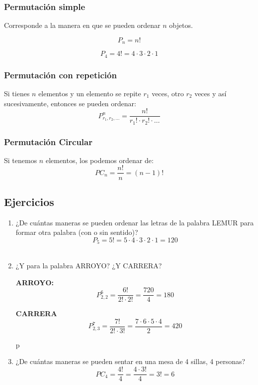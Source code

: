 \documentclass[12pt, letterpaper]{article}
\begin{document}
\subsubsection{Permutación simple} Corresponde a la manera en que se pueden ordenar $n$ objetos.
\begin{minipage}{0.35\textwidth}
	\centering
	\[ P_n = n! \]
\end{minipage}
\hfill
\begin{minipage}{0.55\textwidth}
	\centering
	\[ P_4 = 4!= 4 \cdot 3 \cdot 2 \cdot 1 \]
\end{minipage}

\subsubsection{Permutación con repetición} Si tienes $n$ elementos y un elemento se repite $r_1$ veces, otro $r_2$ veces y así sucesivamente, entonces se pueden ordenar:
\[ P_{r_1, r_2, \dots}^n = \frac{n!}{r_1! \cdot r_2! \cdot \dots} \]

\subsubsection{Permutación Circular} Si tenemos $n$ elementos, los podemos ordenar de:
\[ PC_n = \frac{n!}{n} = (n-1)! \]

\subsection{Ejercicios}

\begin{enumerate}[label=\alph*.)]
	\item ¿De cuántas maneras se pueden ordenar las letras de la palabra LEMUR para formar otra palabra (con o sin sentido)?
	      \[ P_5 = 5! = 5 \cdot 4 \cdot 3 \cdot 2 \cdot 1 = 120 \] \\

	\item ¿Y para la palabra ARROYO? ¿Y CARRERA?
	      \begin{minipage}{0.45\textwidth}
		      \centering
		      \textbf{ARROYO:}
		      \[ P_{2, 2}^6 = \frac{6!}{2! \cdot 2!} = \frac{720}{4} = 180 \]
	      \end{minipage}
	      \hfill
	      \begin{minipage}{0.45\textwidth}
		      \centering
		      \textbf{CARRERA}
		      \[ P_{2,3}^7 = \frac{7!}{2! \cdot 3!} = \frac{7\cdot 6 \cdot 5 \cdot 4}{2} = 420 \]
	      \end{minipage}

	      \phantom p \\

	\item ¿De cuántas maneras se pueden sentar en una mesa de 4 sillas, 4 personas?
	      \[ PC_4 = \frac{4!}{4} =\frac{4 \cdot 3!}{4} = 3! = 6 \]
\end{enumerate}
\newpage
\end{document}

